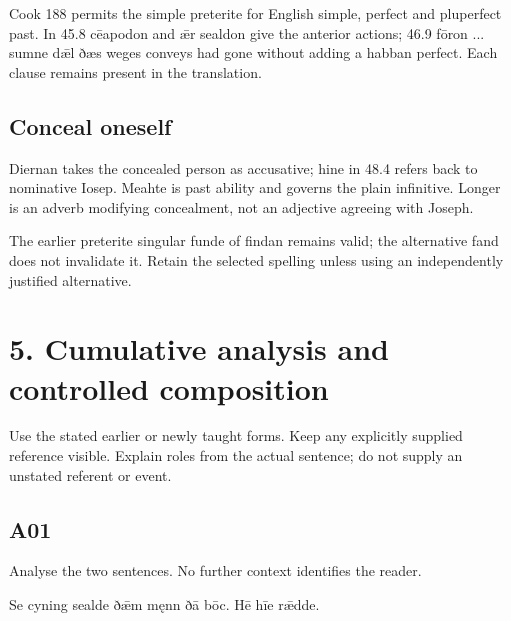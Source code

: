Cook 188 permits the simple preterite for English simple, perfect and pluperfect past. In 45.8 cēapodon and ǣr sealdon give the anterior actions; 46.9 fōron ... sumne dǣl ðæs weges conveys had gone without adding a habban perfect. Each clause remains present in the translation.

\subsection*{Conceal oneself}

Diernan takes the concealed person as accusative; hine in 48.4 refers back to nominative Iosep. Meahte is past ability and governs the plain infinitive. Longer is an adverb modifying concealment, not an adjective agreeing with Joseph.

The earlier preterite singular funde of findan remains valid; the alternative fand does not invalidate it. Retain the selected spelling unless using an independently justified alternative.

\section*{5. Cumulative analysis and controlled composition}

Use the stated earlier or newly taught forms. Keep any explicitly supplied reference visible. Explain roles from the actual sentence; do not supply an unstated referent or event.

\subsection*{A01}

Analyse the two sentences. No further context identifies the reader.

Se cyning sealde ðǣm męnn ðā bōc. Hē hīe rǣdde.


